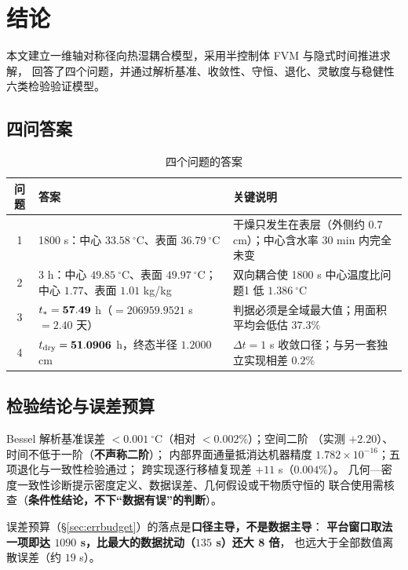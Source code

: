 \section{结论}

本文建立一维轴对称径向热湿耦合模型，采用半控制体 FVM 与隐式时间推进求解，
回答了四个问题，并通过解析基准、收敛性、守恒、退化、灵敏度与稳健性六类检验验证模型。

\subsection{四问答案}

\begin{table}[H]
  \centering
  \caption{四个问题的答案}
  \label{tab:answers}
  \footnotesize
  \begin{tabularx}{\textwidth}{@{}clX@{}}
    \toprule
    问题 & 答案 & 关键说明 \\
    \midrule
    1 & 1800 s：中心 $33.58\ ^\circ$C、表面 $36.79\ ^\circ$C
      & 干燥只发生在表层（外侧约 0.7 cm）；中心含水率 30 min 内完全未变 \\
    2 & 3 h：中心 $49.85\ ^\circ$C、表面 $49.97\ ^\circ$C；
        中心 $1.77$、表面 $1.01$ kg/kg
      & 双向耦合使 1800 s 中心温度比问题1 低 $1.386\ ^\circ$C \\
    3 & $t_{*}=\mathbf{57.49}$ h（$=206959.9521$ s $=2.40$ 天）
      & 判据必须是全域最大值；用面积平均会低估 $37.3\%$ \\
    4 & $t_{\mathrm{dry}}=\mathbf{51.0906}$ h，终态半径 $1.2000$ cm
      & $\Delta t=1$ s 收敛口径；与另一套独立实现相差 $0.2\%$ \\
    \bottomrule
  \end{tabularx}
\end{table}

\subsection{检验结论与误差预算}

Bessel 解析基准误差 $<0.001\ ^\circ$C（相对 $<0.002\%$）；空间二阶
（实测 $+2.20$）、时间不低于一阶（\textbf{不声称二阶}）；
内部界面通量抵消达机器精度 $1.782\times10^{-16}$；五项退化与一致性检验通过；
跨实现逐行移植复现差 $+11$ s（$0.004\%$）。
几何—密度一致性诊断提示密度定义、数据误差、几何假设或干物质守恒的
联合使用需核查（\textbf{条件性结论，不下``数据有误''的判断}）。

误差预算（\S\ref{sec:errbudget}）的落点是\textbf{口径主导，不是数据主导}：
\textbf{平台窗口取法一项即达 $1090$ s，比最大的数据扰动（$135$ s）还大 8 倍}，
也远大于全部数值离散误差（约 $19$ s）。

